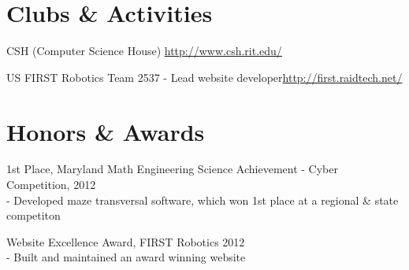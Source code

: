 \documentclass[a4paper,margin,line,11pt]{resume}
\newcommand{\rurl}[1]{\hfill {\footnotesize \url{#1}}}
\begin{document}
\begin{resume}
\section{\mysidestyle Clubs \& Activities}
	\begin{asparablank}
		\item CSH ({\small Computer Science House}) \rurl{http://www.csh.rit.edu/}
		\item US FIRST Robotics Team 2537 - {\small Lead website developer}\rurl{http://first.raidtech.net/}
	\end{asparablank}

\section{\mysidestyle Honors \& Awards}
	\begin{asparablank}
		\item 1st Place, Maryland Math Engineering Science Achievement - Cyber Competition, 2012
		\\ - Developed maze transversal software, which won 1st place at a regional \& state competiton
		\item Website Excellence Award, FIRST Robotics 2012
		\\ - Built and maintained an award winning website 
	\end{asparablank}

\end{resume}
\end{document}

